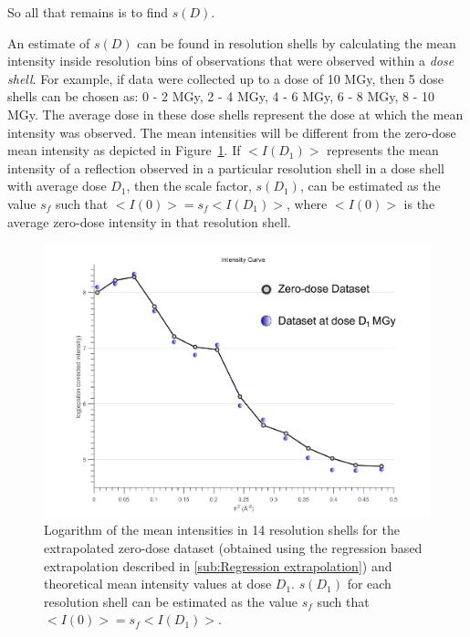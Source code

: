 So all that remains is to find $s(D)$.

An estimate of $s(D)$ can be found in resolution shells by calculating the mean intensity inside resolution bins of observations that were observed within a \textit{dose shell}.
For example, if data were collected up to a dose of 10 MGy, then 5 dose shells can be chosen as: 0 - 2 MGy, 2 - 4 MGy, 4 - 6 MGy, 6 - 8 MGy, 8 - 10 MGy.
The average dose in these dose shells represent the dose at which the mean intensity was observed.
The mean intensities will be different from the zero-dose mean intensity as depicted in Figure~\ref{fig:mean intensity in resolution shells, various doses - Extrapolation method}.
If $<I(D_1)>$ represents the mean intensity of a reflection observed in a particular resolution shell in a dose shell with average dose $D_1$, then the scale factor, $s(D_1)$, can be estimated as the value $s_f$ such that $<I(0)> = s_f <I(D_1)>$, where $<I(0)>$ is the average zero-dose intensity in that resolution shell.
\begin{figure}
  \centering
    \includegraphics[width=1\textwidth]{figures/zde/extrapolationscaling_scale_points.pdf}
    \caption[Logarithm of the zero-dose mean intensities in 14 resolution shells with theoretical means for a later dataset.]{Logarithm of the mean intensities in 14 resolution shells for the extrapolated zero-dose dataset (obtained using the regression based extrapolation described in \ref{sub:Regression extrapolation}) and theoretical mean intensity values at dose $D_1$.
    $s(D_1)$ for each resolution shell can be estimated as the value $s_f$ such that $<I(0)> = s_f <I(D_1)>$.}
    \label{fig:mean intensity in resolution shells, various doses - Extrapolation method}
\end{figure}
